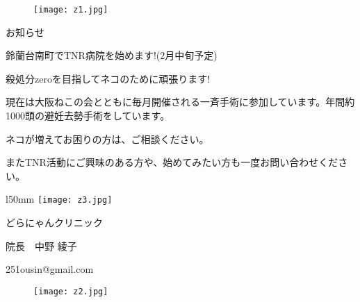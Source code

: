 \documentclass[b5paper]{jsarticle}
\begin{document}
\begin{figure}[htbp]
	\begin{flushleft}
		\texttt{[image: z1.jpg]}
		\captionsetup{labelformat=empty,labelsep=none}
		\caption{}
		\label{}
	\end{flushleft}
\end{figure}

\HUGE

\begin{center}
\vspace{-50pt}
お知らせ
\end{center}

\LARGE

\noindent 鈴蘭台南町でTNR病院を始めます!(2月中旬予定)

\noindent 殺処分zeroを目指してネコのために頑張ります!

\noindent 現在は大阪ねこの会とともに毎月開催される一斉手術に参加しています。年間約1000頭の避妊去勢手術をしています。

\noindent ネコが増えてお困りの方は、ご相談ください。

\noindent またTNR活動にご興味のある方や、始めてみたい方も一度お問い合わせください。



\begin{wrapfigure}[3]{l}{50mm}
	\vspace*{-\intextsep}
	\texttt{[image: z3.jpg]}
	\captionsetup{labelformat=empty,labelsep=none}
	\caption{}
	\label{}
\end{wrapfigure}

\hspace{50pt}どらにゃんクリニック

\hspace{90pt}院長　中野 綾子

\hspace{70pt}251ousin@gmail.com


\begin{figure}[htbp]
	\begin{flushright}
		\texttt{[image: z2.jpg]}
		\captionsetup{labelformat=empty,labelsep=none}
		\caption{}
		\label{}
	\end{flushright}
\end{figure}
\end{document}
